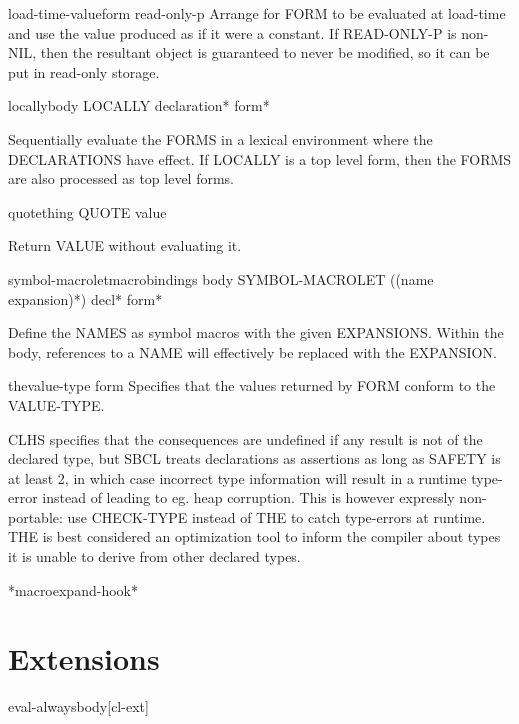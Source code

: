 \begin{specialop}{load-time-value}{form \op read-only-p}
  Arrange for FORM to be evaluated at load-time and use the value produced
   as if it were a constant. If READ-ONLY-P is non-NIL, then the resultant
   object is guaranteed to never be modified, so it can be put in read-only
   storage.
\end{specialop}

\begin{specialop}{locally}{\body body}
  LOCALLY declaration* form*

Sequentially evaluate the FORMS in a lexical environment where the
DECLARATIONS have effect. If LOCALLY is a top level form, then the FORMS are
also processed as top level forms.
\end{specialop}

\begin{specialop}{quote}{thing}
  QUOTE value

Return VALUE without evaluating it.
\end{specialop}

\begin{specialop}{symbol-macrolet}{macrobindings \body body}
  SYMBOL-MACROLET ({(name expansion)}*) decl* form*

Define the NAMES as symbol macros with the given EXPANSIONS. Within the
body, references to a NAME will effectively be replaced with the EXPANSION.
\end{specialop}

\begin{specialop}{the}{value-type form}
  Specifies that the values returned by FORM conform to the VALUE-TYPE.

CLHS specifies that the consequences are undefined if any result is
not of the declared type, but SBCL treats declarations as assertions
as long as SAFETY is at least 2, in which case incorrect type
information will result in a runtime type-error instead of leading to
eg. heap corruption. This is however expressly non-portable: use
CHECK-TYPE instead of THE to catch type-errors at runtime. THE is best
considered an optimization tool to inform the compiler about types it
is unable to derive from other declared types.
\end{specialop}

\begin{variable}{*macroexpand-hook*}{}
  
\end{variable}

\section{Extensions}
\label{sec:extensions}

\begin{macro}{eval-always}{\body body}[cl-ext]
  
\end{macro}


